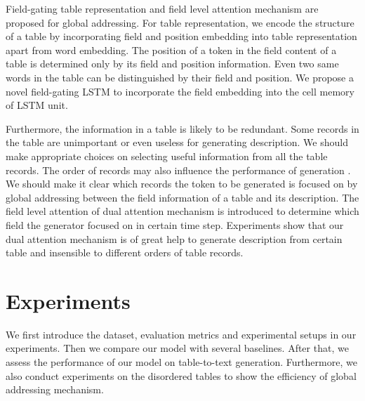 \documentclass[letterpaper]{article} %
\begin{document}
Field-gating table representation and field level attention mechanism are proposed for global addressing.
For table representation, we encode the structure of a table by incorporating field and position embedding into table representation apart from word embedding.
The position of a token in the field content of a table is determined only by its field and position information. Even two same words in the table can be distinguished by their field and position. 
We propose a novel field-gating LSTM to incorporate the field embedding into the cell memory of LSTM unit.

Furthermore, the information in a table is likely to be redundant. Some records in the table are unimportant or even useless for generating description. We should make appropriate choices on selecting useful information from all the table records.
The order of records may also influence the performance of generation \cite{vinyals2015order}. 
We should make it clear which records the token to be generated is focused on by global addressing between the field information of a table and its description. 
The field level attention of dual attention mechanism is introduced to determine which field the generator focused on in certain time step. 
Experiments show that our dual attention mechanism is of great help to generate description from certain table and insensible to different orders of table records.  



\section{Experiments} 
We first introduce the dataset, evaluation metrics and experimental setups in our experiments. Then we compare our model with several baselines. After that, we assess the performance of our model on table-to-text generation. Furthermore, we also conduct experiments on the disordered tables to show the efficiency of global addressing mechanism.     
\end{document}
